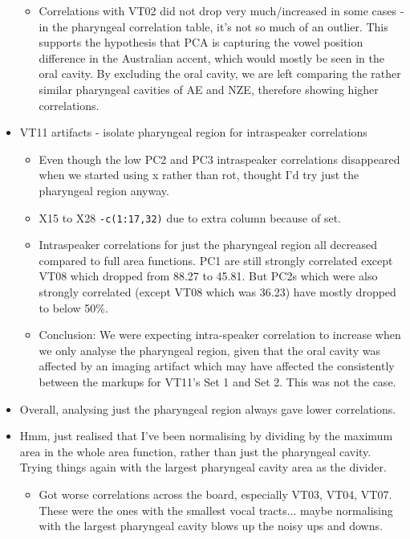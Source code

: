 \documentclass{article}
\begin{document}
\begin{itemize}
\begin{itemize}
        \item Correlations with VT02 did not drop very much/increased in some cases - in the pharyngeal correlation table, it's not so much of an outlier. This supports the hypothesis that PCA is capturing the vowel position difference in the Australian accent, which would mostly be seen in the oral cavity. By excluding the oral cavity, we are left comparing the rather similar pharyngeal cavities of AE and NZE, therefore showing higher correlations.
    \end{itemize}
    \item VT11 artifacts - isolate pharyngeal region for intraspeaker correlations
    \begin{itemize}
        \item Even though the low PC2 and PC3 intraspeaker correlations disappeared when we started using x rather than rot, thought I'd try just the pharyngeal region anyway.
        \item X15 to X28 \verb|-c(1:17,32)| due to extra column because of set.
        \item Intraspeaker correlations for just the pharyngeal region all decreased compared to full area functions. PC1 are still strongly correlated except VT08 which dropped from 88.27 to 45.81. But PC2s which were also strongly correlated (except VT08 which was 36.23) have mostly dropped to below 50\%.
        \item Conclusion: We were expecting intra-speaker correlation to increase when we only analyse the pharyngeal region, given that the oral cavity was affected by an imaging artifact which may have affected the consistently between the markups for VT11's Set 1 and Set 2. This was not the case.
    \end{itemize}
    \item Overall, analysing just the pharyngeal region always gave lower correlations.
    \item Hmm, just realised that I've been normalising by dividing by the maximum area in the whole area function, rather than just the pharyngeal cavity. Trying things again with the largest pharyngeal cavity area as the divider. 
    \begin{itemize}
        \item Got worse correlations across the board, especially VT03, VT04, VT07. These were the ones with the smallest vocal tracts... maybe normalising with the largest pharyngeal cavity blows up the noisy ups and downs.
    \end{itemize}

\end{itemize}
\end{document}
